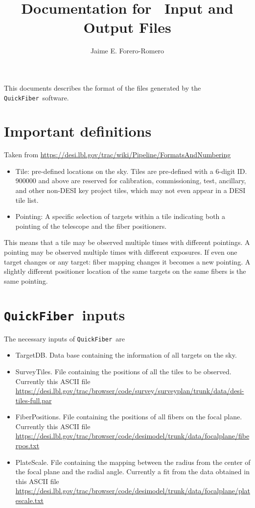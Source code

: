 \documentclass{article}
\title{Documentation for \code\ Input and Output Files}
\author{Jaime E. Forero-Romero}
\newcommand{\code}{{\texttt{QuickFiber}}}
\begin{document}
\maketitle
\tableofcontents 

\vspace{1cm}
This documents describes the format of the files generated by the
\code\ software.  

\section{Important definitions}
Taken from \url{https://desi.lbl.gov/trac/wiki/Pipeline/FormatsAndNumbering}
\begin{itemize}

  \item Tile: pre-defined locations on the sky. Tiles are pre-defined
    with a 6-digit ID. 900000 and above are reserved for calibration,
    commissioning, test, ancillary, and other non-DESI key project
    tiles, which may not even appear in a DESI tile list.  
  \item Pointing: A specific
    selection of targets within a tile indicating both a pointing of the
    telescope and the fiber positioners.  
\end{itemize}

This means that a tile may be observed
multiple times with different pointings. A pointing may be observed
multiple times with different exposures. If even one target changes
or any target: fiber mapping changes it becomes a new pointing. A
slightly different positioner location of the same targets on the
same fibers is the same pointing.  

\section{\code\ inputs}
The necessary inputs of \code\ are 
\begin{itemize}
\item TargetDB. Data base containing the information of all targets on the sky. 
\item SurveyTiles. File containing the positions of all the tiles to
  be observed. 
Currently this ASCII file\\
  \url{https://desi.lbl.gov/trac/browser/code/survey/surveyplan/trunk/data/desi-tiles-full.par}  
\item FiberPositions. File containing the positions of all fibers on
  the focal plane.  
Currently this ASCII file\\
  \url{https://desi.lbl.gov/trac/browser/code/desimodel/trunk/data/focalplane/fiberpos.txt} 
\item PlateScale. File containing the mapping between the radius from
  the center of the focal plane and the radial angle.
  Currently a fit from the data obtained in this ASCII file\\
  \url{https://desi.lbl.gov/trac/browser/code/desimodel/trunk/data/focalplane/platescale.txt} 
\end{itemize}
\end{document}
